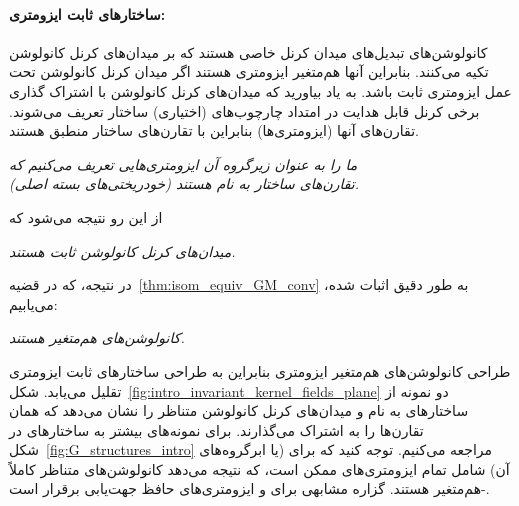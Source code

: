 \paragraph{ساختارهای  ثابت ایزومتری:}
کانولوشن‌های \lr{$\GM$} تبدیل‌های میدان کرنل خاصی هستند
که بر میدان‌های کرنل کانولوشن \lr{$\GM$} تکیه می‌کنند.
بنابراین آنها هم‌متغیر ایزومتری هستند اگر میدان کرنل کانولوشن \lr{$\GM$} تحت عمل ایزومتری ثابت باشد.
به یاد بیاورید که میدان‌های کرنل کانولوشن \lr{$\GM$} با اشتراک گذاری برخی کرنل قابل هدایت  در امتداد چارچوب‌های (اختیاری) ساختار  تعریف می‌شوند.
تقارن‌های آنها (ایزومتری‌ها) بنابراین با تقارن‌های ساختار  منطبق هستند.
\begin{center}\it
	ما  را به عنوان زیرگروه آن ایزومتری‌هایی تعریف می‌کنیم که \\
	تقارن‌های ساختار  به نام \lr{$\GM$} هستند (خودریختی‌های بسته اصلی).
\end{center}
\begin{minipage}{\textwidth}
	از این رو نتیجه می‌شود که
	\begin{center}\it
		میدان‌های کرنل کانولوشن \lr{$\GM$} ثابت  هستند.
	\end{center}
	\vspace*{1ex}\end{minipage}
\begin{minipage}{\textwidth}
	در نتیجه، که در قضیه~\ref{thm:isom_equiv_GM_conv} به طور دقیق اثبات شده، می‌یابیم:
	\begin{center}\it
		کانولوشن‌های \lr{$\GM$} هم‌متغیر  هستند.
	\end{center}
	\vspace*{1ex}\end{minipage}
طراحی کانولوشن‌های \lr{$\GM$} هم‌متغیر ایزومتری بنابراین به طراحی ساختارهای  ثابت ایزومتری تقلیل می‌یابد.
شکل~\ref{fig:intro_invariant_kernel_fields_plane} دو نمونه از ساختارهای  به نام \lr{$\GM$} و میدان‌های کرنل کانولوشن \lr{$\GM$} متناظر را نشان می‌دهد که همان تقارن‌ها را به اشتراک می‌گذارند.
برای نمونه‌های بیشتر به ساختارهای  در شکل~\ref{fig:G_structures_intro} مراجعه می‌کنیم.
توجه کنید که  برای  (یا ابرگروه‌های آن) شامل تمام ایزومتری‌های ممکن است، که نتیجه می‌دهد کانولوشن‌های \lr{$\GM$} متناظر کاملاً -هم‌متغیر هستند.
گزاره مشابهی برای  و ایزومتری‌های حافظ جهت‌یابی برقرار است.

